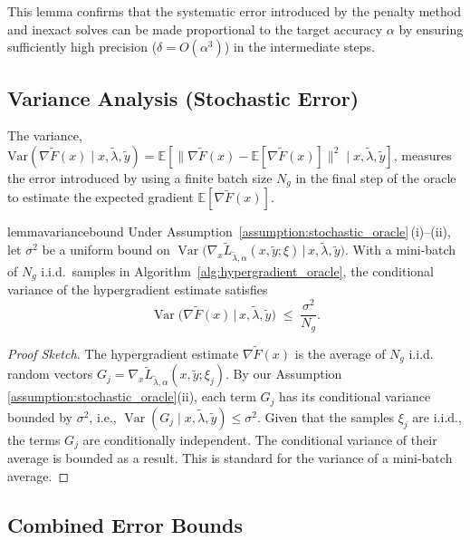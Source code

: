\documentclass[letterpaper]{article} %
\newcommand{\1}{\mathbf{1}}
\begin{document}
This lemma confirms that the systematic error introduced by the penalty method and inexact solves can be made proportional to the target accuracy $\alpha$ by ensuring sufficiently high precision ($\delta=O(\alpha^3)$) in the intermediate steps.

\subsection{Variance Analysis (Stochastic Error)}

The variance, $\text{Var}(\nabla\tilde{F}(x)\mid x, \tilde{\lambda}, \tilde{y}) = \mathbb{E}[\|\nabla\tilde{F}(x) - \mathbb{E}[\nabla\tilde{F}(x)]\|^2\mid x, \tilde{\lambda}, \tilde{y}]$, measures the error introduced by using a finite batch size $N_g$ in the final step of the oracle to estimate the expected gradient $\mathbb{E}[\nabla\tilde{F}(x)]$.

\begin{restatable}{lemma}{variancebound}
\label{lemma:variance-bound}
Under Assumption~\ref{assumption:stochastic_oracle}\,(i)--(ii),
let $\sigma^2$ be a uniform bound on 
\(
\operatorname{Var}\!\bigl(\nabla_x \tilde L_{\tilde\lambda,\alpha}(x,\tilde y;\xi)\,\big|\,x,\tilde\lambda,\tilde y\bigr).
\)
With a mini‑batch of $N_g$ i.i.d.\ samples in Algorithm~\ref{alg:hypergradient_oracle}, the conditional variance of the hypergradient estimate satisfies
\[
\operatorname{Var}\!\bigl(\nabla\tilde F(x)\,\big|\,x,\tilde\lambda,\tilde y\bigr)
\;\le\;
\frac{\sigma^{2}}{N_g}.
\]
\end{restatable}
\begin{proof}[Proof Sketch]
The hypergradient estimate $\nabla\tilde{F}(x)$ is the average of $N_g$ i.i.d. random vectors $G_j = \nabla_x \tilde L_{\tilde\lambda,\alpha}(x, \tilde y;\xi_j)$. By our Assumption \ref{assumption:stochastic_oracle}(ii), each term $G_j$ has its conditional variance bounded by $\sigma^2$, i.e., $\operatorname{Var}(G_j \mid x, \tilde{\lambda}, \tilde{y}) \leq \sigma^2$. Given that the samples $\xi_j$ are i.i.d., the terms $G_j$ are conditionally independent. The conditional variance of their average is bounded as a result. This is standard for the variance of a mini-batch average.
\end{proof}

\subsection{Combined Error Bounds}
\end{document}
